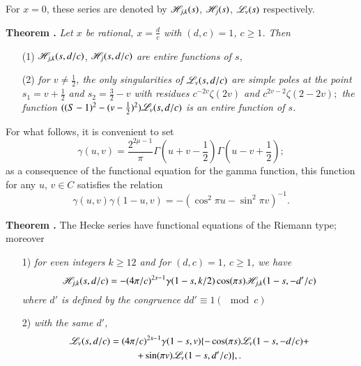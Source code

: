 For $x =0$, these series are denoted by $\mathscr{H}_{j,k} (s)$, $\mathscr{H}_j(s)$, $\mathscr{L}_v(s)$ respectively.

\medskip
\noindent
{\bfseries Theorem .\label{art7-thm7}}
\textit{Let $x$ be rational, $x =\frac{d}{c}$ with $(d,c) =1$, $c \geqslant 1$. Then }
\begin{enumerate}
\item[(1)] $\mathscr{H}_{j,k} (s, d/c)$, $\mathscr{H}_j(s, d/c)$ \textit{ are entire functions of $s$,}

\item[(2)] \textit{for $v \neq \frac{1}{2}$, the only singularities of $\mathscr{L}_v (s, d/c)$ are simple poles at the point $s_1 = v+\frac{1}{2}$ and $s_2 = \frac{3}{2}-v$ with residues $c^{-2v} \zeta(2v)$ and $c^{2v-2} \zeta(2-2v);$ the function $((S-1)^2 -(v-\frac{1}{2})^2) \mathscr{L}_v(s, d/c)$ is an entire function of $s$.}       
\end{enumerate}
 
For what follows, it is convenient to set
\begin{equation}
\gamma (u, v) = \frac{2^{2\mu-1}}{\pi} \Gamma (u+ v - \frac{1}{2}) \Gamma (u -v + \frac{1}{2}); 
\label{art7-eq1.48}
\end{equation}
as a consequence of the functional equation for the gamma function, this function for any $u$, $v \in C$ satisfies the relation
\begin{equation}
\gamma (u,v) \gamma (1-u, v) = - (\cos^2 \pi u - \sin^2 \pi v)^{-1} . \label{art7-eq1.49}
\end{equation}

\medskip
\noindent
{\bfseries Theorem .\label{art7-thm8}} The Hecke series have functional equations of the Riemann type; moreover
\begin{enumerate}
\item[1)] \textit{for even integers $k \geqslant 12$ and for $(d,c) =1$, $c \geqslant 1$, we have}
\begin{equation}
\mathscr{H}_{j,k} (s, d/c) = - (4\pi /c)^{2s-1} \gamma (1-s, k/2) \cos (\pi s) \mathscr{H}_{j,k} (1-s, -d'/c)
\label{art7-eq1.50}
\end{equation}
\textit{where $d'$ is defined by the congruence $dd' \equiv 1 (\mod c)$}

\item[2)] \textit{with the same $d'$,}
\begin{gather}
\mathscr{L}_v (s, d/c) = (4\pi /c)^{2s-1} \gamma (1-s, v) \{-\cos (\pi s) \mathscr{L}_v(1-s, -d/c) +\label{art7-eq1.51} \\
+ \sin (\pi v) \mathscr{L}_v (1-s, d'/c) \}, \notag.\\
\end{gather}
\end{enumerate}










